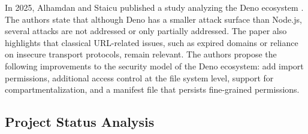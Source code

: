
In 2025, Alhamdan and Staicu published a study analyzing the Deno ecosystem \cite{Alhamdan:Staicu:2025}.
The authors state that although Deno has a smaller attack surface than Node.js, several attacks are not addressed or only partially addressed.
The paper also highlights that classical URL-related issues, such as expired domains or reliance on insecure transport protocols, remain relevant.
The authors propose the following improvements to the security model of the Deno ecosystem: add import permissions, additional access control at the file system level, support for compartmentalization, and a manifest file that persists fine-grained permissions.

\subsection{Project Status Analysis}


